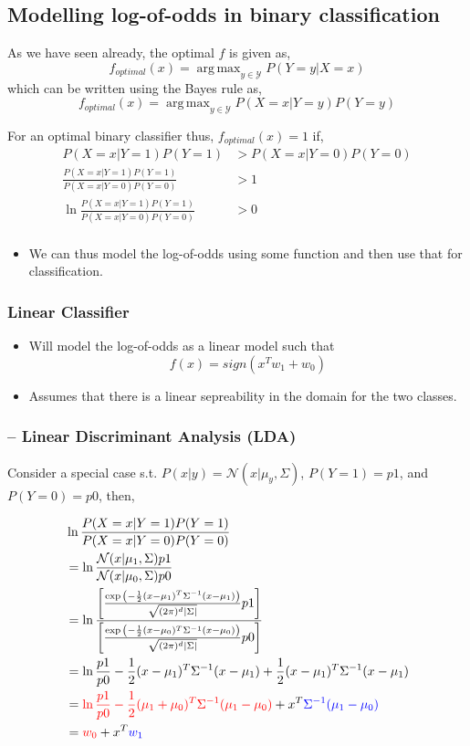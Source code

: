 \documentclass{article}
\DeclareMathOperator*{\argmax}{arg\,max}
\newcommand{\red}[1]{\textcolor{red}{#1}}
\newcommand{\blue}[1]{\textcolor{blue}{#1}}
\newcommand{\mcaly}{\mathcal{Y}}
\begin{document}
\subsection{Modelling log-of-odds in binary classification}
As we have seen already, the optimal $f$ is given as,
$$f_{optimal}(x) = \argmax_{y \in \mcaly} P(Y=y|X=x)$$
which can be written using the Bayes rule as,
$$f_{optimal}(x) = \argmax_{y \in \mcaly} P(X=x|Y=y)P(Y=y)$$

For an optimal binary classifier thus, $f_{optimal}(x) = 1$ if,
\begin{align*}
    P(X=x|Y=1)P(Y=1) &> P(X=x|Y=0)P(Y=0) \\
    \frac{P(X=x|Y=1)P(Y=1)}{P(X=x|Y=0)P(Y=0)} &> 1 \\
    \ln{\frac{P(X=x|Y=1)P(Y=1)}{P(X=x|Y=0)P(Y=0)}} &> 0 \\
\end{align*}

\begin{itemize}
    \item We can thus model the log-of-odds using some function and then use that for classification.
\end{itemize}

\subsubsection{Linear Classifier}

\begin{itemize}
    \item Will model the log-of-odds as a linear model such that $$f(x) = sign(x^Tw_1+w_0)$$
    \item Assumes that there is a linear sepreability in the domain for the two classes.
\end{itemize}

\subsubsection{-- Linear Discriminant Analysis (LDA)}
Consider a special case s.t. $P(x|y) = \mathcal{N}(x|\mu_y, \Sigma)$, $P(Y=1) = p1$, and $P(Y=0)=p0$, then,

\begin{align*}
    &\ln{\frac{P(X=x|Y=1)P(Y=1)}{P(X=x|Y=0)P(Y=0)}}\\
    &= \ln{\frac{\mathcal{N}(x|\mu_1,\Sigma)p1}{\mathcal{N}(x|\mu_0,\Sigma)p0}} \\
    &= \ln{\frac{\left[\frac{\exp{\left(-\frac{1}{2}(x-\mu_1)^T\Sigma^{-1}(x-\mu_1)\right)}}{\sqrt{(2\pi)^d|\Sigma|}}p1\right]}{\left[\frac{\exp{\left(-\frac{1}{2}(x-\mu_0)^T\Sigma^{-1}(x-\mu_0)\right)}}{\sqrt{(2\pi)^d|\Sigma|}}p0\right]}} \\
    &= \ln{\frac{p1}{p0}}-\frac{1}{2}(x-\mu_1)^T\Sigma^{-1}(x-\mu_1) + \frac{1}{2}(x-\mu_1)^T\Sigma^{-1}(x-\mu_1)\\
    &= \red{\ln{\frac{p1}{p0}}-\frac{1}{2}(\mu_1+\mu_0)^T\Sigma^{-1}(\mu_1-\mu_0)} + x^T\blue{\Sigma^{-1}(\mu_1-\mu_0)}\\
    &= \red{w_0} + x^T\blue{w_1}\\
\end{align*}
\end{document}

